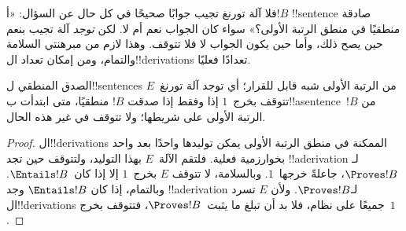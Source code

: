 \documentclass[../../../include/open-logic-section]{subfiles}
\begin{document}
\begin{explain}
فلا آلة تورنغ تجيب جوابًا صحيحًا في كل حال عن السؤال:
«أ$!B$ !!{sentence} صادقة منطقيًا في منطق الرتبة الأولى؟»
سواء كان الجواب نعم أم لا. لكن \emph{توجد} آلة تجيب بنعم حين
يصح ذلك، وأما حين يكون الجواب لا فلا تتوقف. وهذا لازم من
مبرهنتي السلامة والتمام، ومن إمكان تعداد ال!!{derivation}s
تعدادًا فعليًا.
\end{explain}

\begin{thm}
  الصدق المنطقي ل!!{sentence}s من الرتبة الأولى شبه قابل
  للقرار؛ أي توجد آلة تورنغ~$E$ تتوقف بخرج~$1$ إذا وفقط إذا
  صدقت $!B$ منطقيًا، متى ابتدأت ب!!a{sentence}~$!B$
  من الرتبة الأولى على شريطها؛ ولا تتوقف في غير هذه الحال.
\end{thm}

\begin{proof}
  ال!!{derivation}s الممكنة في منطق الرتبة الأولى يمكن توليدها
  واحدًا بعد واحد بخوارزمية فعلية. فلتقم الآلة~$E$ بهذا
  التوليد، ولتتوقف حين تجد !!a{derivation} لـ$\Proves !B$،
  جاعلةً خرجها~$1$. وبالسلامة، لا تتوقف $E$ بخرج~$1$
  إلا إذا كان~$\Entails !B$. وبالتمام، إذا كان
  $\Entails !B$ وجد !!a{derivation} لـ$\Proves !B$.
  ولأن $E$ تسرد ال!!{derivation}s جميعًا على نظام،
  فلا بد أن تبلغ ما يثبت~$\Proves !B$، فتتوقف بخرج~$1$.
\end{proof}
\end{document}
